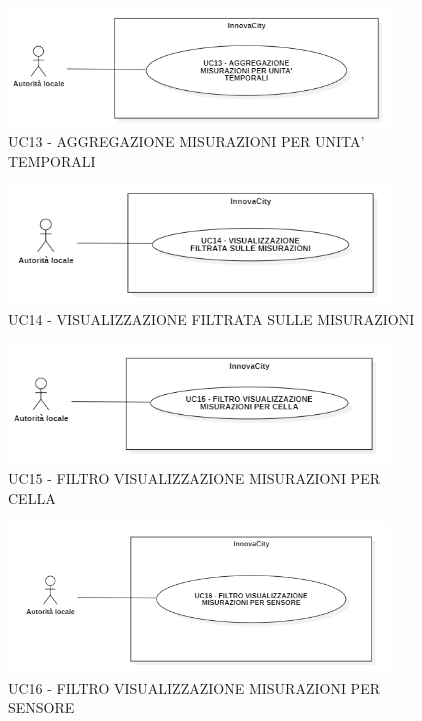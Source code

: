 \begin{figure}[H]
    \centering
    \includegraphics[width=0.9\textwidth]{../Images/uc13.PNG}
    \caption{UC13 - AGGREGAZIONE MISURAZIONI PER UNITA' TEMPORALI}
    \label{fig:UC7}
\end{figure}

\begin{figure}[H]
    \centering
    \includegraphics[width=0.9\textwidth]{../Images/uc14.PNG}
    \caption{UC14 - VISUALIZZAZIONE FILTRATA SULLE MISURAZIONI}
    \label{fig:UC7}
\end{figure}

\begin{figure}[H]
    \centering
    \includegraphics[width=0.9\textwidth]{../Images/uc15.PNG}
    \caption{UC15 - FILTRO VISUALIZZAZIONE MISURAZIONI PER CELLA}
    \label{fig:UC7}
\end{figure}

\begin{figure}[H]
    \centering
    \includegraphics[width=0.9\textwidth]{../Images/uc16.PNG}
    \caption{UC16 - FILTRO VISUALIZZAZIONE MISURAZIONI PER SENSORE}
    \label{fig:UC7}
\end{figure}
